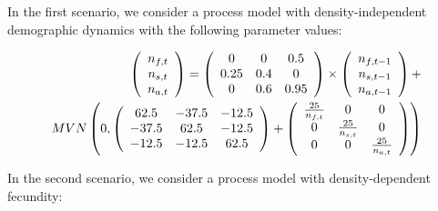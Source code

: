 \documentclass[12pt,a4paper]{article}
\begin{document}
In the first scenario, we consider a process model with density-independent demographic dynamics with the following parameter values:

\begin{align}\label{FullModel_DI}
	\left(\begin{array}{c}
		{n_{f, t}} \\ 
		{n_{s, t}} \\ 
		{n_{a, t}}
	\end{array}\right)=
	\left(\begin{array}{ccc}{0} & {0} & {0.5} \\
		{0.25} & {0.4} & {0} \\
		{0} & {0.6} & {0.95}
	\end{array}\right)
	\times\left(\begin{array}{c}
		{n_{f, t-1}} \\ 
		{n_{s, t-1}} \\ 
		{n_{a, t-1}}
	\end{array}\right)+ \notag \\
	MVN\left(0,\left(\begin{array}{ccc}
		{62.5} & {-37.5} & {-12.5} \\
		{-37.5} & {62.5} & {-12.5} \\
		{-12.5} & {-12.5} & {62.5}
	\end{array}\right)+\left(\begin{array}{ccc}
		{\frac{25}{n_{f, t}}} & {0} & {0} \\
		{0} & {\frac{25}{n_{s, t}}} & {0} \\
		{0} & {0} & {\frac{25}{n_{a, t}}}\end{array}\right)\right)\end{align}

In the second scenario, we consider a process model with density-dependent fecundity:
\end{document}

